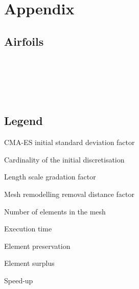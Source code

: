 \documentclass[11pt, twoside]{article}
\begin{document}
\appendix
\renewcommand*{\thefigure}{A\arabic{figure}}
\renewcommand*{\thetable}{A\arabic{table}}

\section{Appendix}

\subsection{Airfoils}
\begin{center}


\vspace{0.75cm}\\


\vspace{0.75cm}\\


\vspace{0.75cm}\\


\vspace{0.75cm}\\


\end{center}

\subsection{Legend}
\begin{minipage}{0.49\linewidth}
	\begin{description}[labelsep=2em,labelwidth=0.5cm,labelindent=0.5cm, itemsep=0cm]
			\item[$\boldsymbol{\sigma}$] CMA-ES initial standard deviation factor
			\item[$\boldsymbol{I}$] Cardinality of the initial discretisation
			\item[$\boldsymbol{G}$] Length scale gradation factor
			\item[$\boldsymbol{D}$] Mesh remodelling removal distance factor
	\end{description}
\end{minipage}
\begin{minipage}{0.49\linewidth}
	\begin{description}[labelsep=2em,labelwidth=1.75cm,labelindent=0.5cm, itemsep=0cm]
		\item[\# Tri.] Number of elements in the mesh
		\item[Time] Execution time
		\item[Preserv.] Element preservation
		\item[+ Tri.] Element surplus
		\item[Sp.-up] Speed-up
	\end{description}
\end{minipage}
\end{document}

